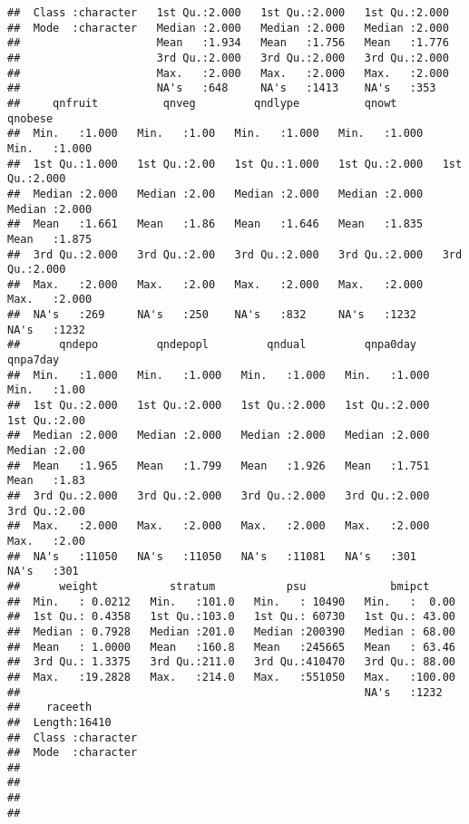 \documentclass[
]{article}
\begin{document}
\begin{verbatim}
##  Class :character   1st Qu.:2.000   1st Qu.:2.000   1st Qu.:2.000  
##  Mode  :character   Median :2.000   Median :2.000   Median :2.000  
##                     Mean   :1.934   Mean   :1.756   Mean   :1.776  
##                     3rd Qu.:2.000   3rd Qu.:2.000   3rd Qu.:2.000  
##                     Max.   :2.000   Max.   :2.000   Max.   :2.000  
##                     NA's   :648     NA's   :1413    NA's   :353    
##     qnfruit          qnveg         qndlype          qnowt          qnobese     
##  Min.   :1.000   Min.   :1.00   Min.   :1.000   Min.   :1.000   Min.   :1.000  
##  1st Qu.:1.000   1st Qu.:2.00   1st Qu.:1.000   1st Qu.:2.000   1st Qu.:2.000  
##  Median :2.000   Median :2.00   Median :2.000   Median :2.000   Median :2.000  
##  Mean   :1.661   Mean   :1.86   Mean   :1.646   Mean   :1.835   Mean   :1.875  
##  3rd Qu.:2.000   3rd Qu.:2.00   3rd Qu.:2.000   3rd Qu.:2.000   3rd Qu.:2.000  
##  Max.   :2.000   Max.   :2.00   Max.   :2.000   Max.   :2.000   Max.   :2.000  
##  NA's   :269     NA's   :250    NA's   :832     NA's   :1232    NA's   :1232   
##      qndepo         qndepopl         qndual         qnpa0day        qnpa7day   
##  Min.   :1.000   Min.   :1.000   Min.   :1.000   Min.   :1.000   Min.   :1.00  
##  1st Qu.:2.000   1st Qu.:2.000   1st Qu.:2.000   1st Qu.:2.000   1st Qu.:2.00  
##  Median :2.000   Median :2.000   Median :2.000   Median :2.000   Median :2.00  
##  Mean   :1.965   Mean   :1.799   Mean   :1.926   Mean   :1.751   Mean   :1.83  
##  3rd Qu.:2.000   3rd Qu.:2.000   3rd Qu.:2.000   3rd Qu.:2.000   3rd Qu.:2.00  
##  Max.   :2.000   Max.   :2.000   Max.   :2.000   Max.   :2.000   Max.   :2.00  
##  NA's   :11050   NA's   :11050   NA's   :11081   NA's   :301     NA's   :301   
##      weight           stratum           psu             bmipct      
##  Min.   : 0.0212   Min.   :101.0   Min.   : 10490   Min.   :  0.00  
##  1st Qu.: 0.4358   1st Qu.:103.0   1st Qu.: 60730   1st Qu.: 43.00  
##  Median : 0.7928   Median :201.0   Median :200390   Median : 68.00  
##  Mean   : 1.0000   Mean   :160.8   Mean   :245665   Mean   : 63.46  
##  3rd Qu.: 1.3375   3rd Qu.:211.0   3rd Qu.:410470   3rd Qu.: 88.00  
##  Max.   :19.2828   Max.   :214.0   Max.   :551050   Max.   :100.00  
##                                                     NA's   :1232    
##    raceeth         
##  Length:16410      
##  Class :character  
##  Mode  :character  
##                    
##                    
##                    
## 
\end{verbatim}
\end{document}
